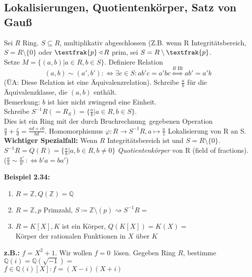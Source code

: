 \documentclass[10pt,a4paper]{article}
\begin{document}
\subsection{Lokalisierungen, Quotientenkörper, Satz von Gauß}

Sei $R$ Ring. $S \subseteq R$, multiplikativ abgeschlossen (Z.B. wenn R Integritätsbereich, $S = R \setminus \lbrace 0 \rbrace$ oder $\textfrak{p} \triangleleft R$ prim, sei $S = R \setminus \textfrak{p}$.\\
Setze $M = \lbrace (a,b) | a \in R, b\in S\rbrace $. Definiere Relation
$$(a,b) \sim (a',b') :\Leftrightarrow \exists c \in S : ab'c = a'bc \overset{R \textrm{ IB}}{\Leftrightarrow} ab' = a'b$$
(ÜA: Diese Relation ist eine Äquivalenzrelation). Schreibe $\frac{a}{b}$ für die Äquivalenzklasse, die $(a,b)$ enthält.\\
\textrm{Bemerkung:} $b$ ist hier nicht zwingend eine Einheit.\\
Schreibe $S^{-1}R (= R_S) = \lbrace \frac{a}{b} | a \in R, b \in S \rbrace$.\\
Dies ist ein Ring mit der durch \glqq Bruchrechnung\grqq \ gegebenen Operation $\frac{a}{b} + \frac{c}{d} = \frac{ad+cb}{bd}$. Homomorphismus $\varphi : R \rightarrow S^{-1}R, a \mapsto \frac{a}{1}$ \grqq Lokalisierung von R an S\grqq .\\
\textbf{Wichtiger Spezialfall:} Wenn $R$ Integritätsbereich ist und $S = R \setminus \lbrace 0 \rbrace$.\\
$S^{-1}R = Q(R) = \lbrace \frac{a}{b} | a,b \in R, b \neq 0 \rbrace$ \emph{Quotientenkörper} von R (field of fractions). ($\frac{a}{b} \sim \frac{a'}{b'}\, :\Leftrightarrow b'a = ba'$) \bigskip

\textbf{Beispiel 2.34:}\begin{enumerate}
\item $R = \mathbb{Z}, Q(\mathbb{Z}) = \mathbb{Q}$
\item $R = \mathbb{Z}, p $ Primzahl, $S \coloneqq \mathbb{Z} \setminus (p) \rightsquigarrow S^{-1}R =$
\item $R = K[X], K$ ist ein Körper, $Q(K[X]) = K(X) =$\\
\glqq Körper der rationalen Funktionen in $X$ über $K$\grqq
\end{enumerate}

\textbf{z.B.:} $f = X^2 + 1$. Wir wollen \glqq $f = 0$\grqq\ lösen. Gegeben Ring $R$, bestimme \\
$\mathbb{Q}(i) = \mathbb{Q}(\sqrt{-1}) =$\\
$f \in \mathbb{Q}(i)[X]: f=(X-i)(X+i)$\bigskip
\end{document}
